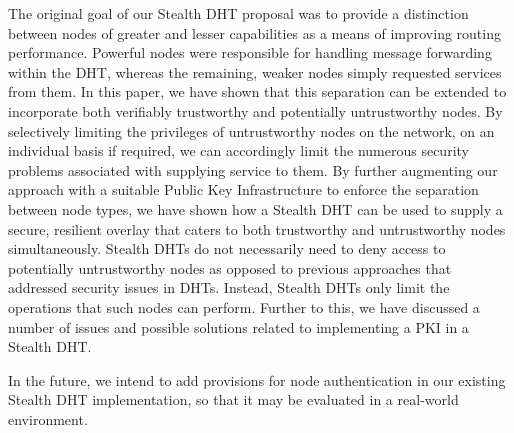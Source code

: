 \documentclass[times, 10pt,twocolumn]{article}
\begin{document}
The original goal of our Stealth DHT proposal
was to provide a distinction between nodes of greater and lesser
capabilities as a means of improving routing performance. Powerful
nodes were responsible for handling message forwarding within the DHT,
whereas the remaining, weaker nodes simply requested services from
them. In this paper, we have shown that this separation can be extended
to incorporate both verifiably trustworthy and potentially
untrustworthy nodes. By selectively limiting the privileges of
untrustworthy nodes on the network, on an individual basis if required,
we can accordingly limit the numerous security problems associated with
supplying service to them. By further augmenting our approach with a
suitable Public Key Infrastructure to enforce the separation between
node types, we have shown how a Stealth DHT can be used to supply a
secure, resilient overlay that caters to both trustworthy and
untrustworthy nodes simultaneously. Stealth DHTs do not necessarily
need to deny access to potentially untrustworthy nodes as opposed to
previous approaches that addressed security issues in DHTs. Instead,
Stealth DHTs only limit the operations that such nodes can perform.
Further to this, we have discussed a number of issues and possible
solutions related to implementing a PKI in a Stealth DHT.

In the future, we intend to add provisions for node authentication
in our existing Stealth DHT implementation, so that it may be
evaluated in a real-world environment.



\end{document}
